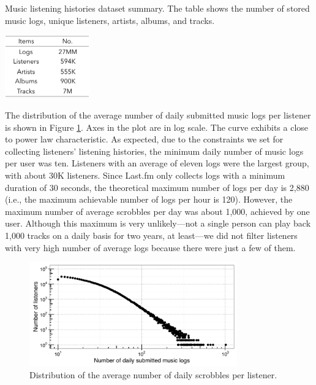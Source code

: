 \begin{table}[htbp]
\vspace{0.75em}
\centering
\caption[Music listening histories dataset summary]{Music listening histories dataset summary. The table shows the number of stored music logs, unique listeners, artists, albums, and tracks.}
\label{table:number_logs}
\includegraphics[width = 0.275\textwidth]{number_logs.pdf}
\end{table}


The distribution of the average number of daily submitted music logs per listener is shown in Figure \ref{fig:daily_submitted_music_logs}. Axes in the plot are in log scale. The curve exhibits a close to power law  characteristic. 
As expected, due to the constraints we set for collecting listeners' listening histories, the minimum daily number of music logs per user was ten. Listeners with an average of eleven logs were the largest group, with about 30K listeners.
Since Last.fm only collects logs with a minimum duration of 30 seconds, the theoretical maximum number of logs per day is 2,880 (i.e., the maximum achievable number of logs per hour is 120). However, the maximum number of average scrobbles per day was about 1,000, achieved by one user. Although this maximum is very unlikely---not a single person can play back 1,000 tracks on a daily basis for two years, at least---we did not filter listeners with very high number of average logs because there were just a few of them.

\begin{figure}[tbp]
\centering
\includegraphics[width=0.8\textwidth]{daily_submitted_music_logs.pdf}
\caption[Distribution of the average number of daily scrobbles per listener]{Distribution of the average number of daily scrobbles per listener.}
\label{fig:daily_submitted_music_logs}
\end{figure}

